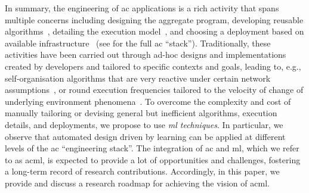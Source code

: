 In summary, the engineering of \ac{ac} applications 
 is a rich activity 
 that spans multiple concerns
 including
 designing the aggregate program,
 developing reusable algorithms~\cite{DBLP:conf/saso/AudritoCDV17,DBLP:journals/cee/AudritoCDPV21},  
 detailing the execution model~\cite{danilo2021lmcs},
 and choosing a deployment
 based on available infrastructure~\cite{DBLP:journals/fi/CasadeiPPVW20} (see  for the full \ac{ac} ``stack'').
%
Traditionally,
 these activities have been carried out 
 through ad-hoc designs and implementations
 created by developers
 and tailored to specific contexts and goals,
 leading to, e.g.,
 self-organisation algorithms 
 that are very reactive under certain network assumptions~\cite{DBLP:journals/cee/AudritoCDPV21},
 or round execution frequencies tailored to the velocity of change of underlying environment phenomena~\cite{danilo2021lmcs}.
%
To overcome the complexity and cost 
 of manually tailoring or devising general but inefficient algorithms, execution details, 
 and deployments,
 we propose to use \emph{\ac{ml} techniques}.
%
In particular, we observe that 
 automated design
 driven by learning
 can be applied at different levels
 of the \ac{ac} ``engineering stack''.
%
The integration of \ac{ac} and \ac{ml}, 
 which we refer to as \ac{acml},
 is expected to provide a lot of opportunities and challenges, fostering a long-term record of research contributions.
%
Accordingly, in this paper,
 we provide and discuss a research roadmap
 for achieving the vision of \ac{acml}.



